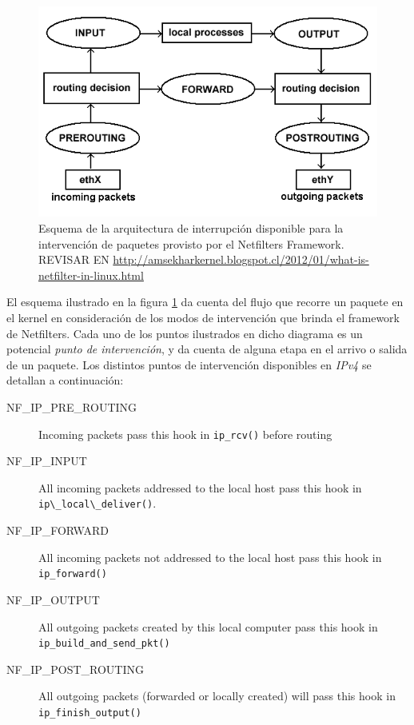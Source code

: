 \begin{figure}[!h]
	\centering
	\includegraphics[scale=.5]{imagenes/netfilterArchitecture}
	\caption{Esquema de la arquitectura de interrupción disponible para la intervención de paquetes provisto por el Netfilters Framework. REVISAR EN \url{http://amsekharkernel.blogspot.cl/2012/01/what-is-netfilter-in-linux.html}}
	\label{netfilterArchitecture}
\end{figure}

El esquema ilustrado en la figura \ref{netfilterArchitecture} da cuenta del flujo que recorre un paquete en el kernel en consideración de los modos de intervención que brinda el framework de Netfilters. Cada uno de los puntos ilustrados en dicho diagrama es un potencial \emph{punto de intervención}, y da cuenta de alguna etapa en el arrivo o salida de un paquete. Los distintos puntos de intervención disponibles en \emph{IPv4} se detallan a continuación:

\begin{description}
\item[NF\_IP\_PRE\_ROUTING] Incoming packets pass this hook in \verb=ip_rcv()= before routing
\item[NF\_IP\_INPUT] All incoming packets addressed to the local host pass this hook in \verb=ip\_local\_deliver()=.
\item[NF\_IP\_FORWARD] All incoming packets not addressed to the local host pass this hook in \verb=ip_forward()=
\item[NF\_IP\_OUTPUT] All outgoing packets created by this local computer pass this hook in \verb=ip_build_and_send_pkt()=
\item[NF\_IP\_POST\_ROUTING] All outgoing packets (forwarded or locally created) will pass this hook in \verb=ip_finish_output()=
\end{description}

